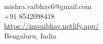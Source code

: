 \documentclass[margin,line]{resume}
\begin{document}
{
    \hfill mishra.vaibhav6@gmail.com \vspace{0mm}\\\vspace{0mm}%
    \hfill +91 8542098418 \vspace{0mm}\\\vspace{0mm}%
    \hfill \href{https://imvaibhav.netlify.app/}{https://imvaibhav.netlify.app/} \vspace{0mm}\\\vspace{-9mm}%
    \hfill Bengaluru, India \vspace{0mm}\\\vspace{-1mm}%
}
\end{document}
